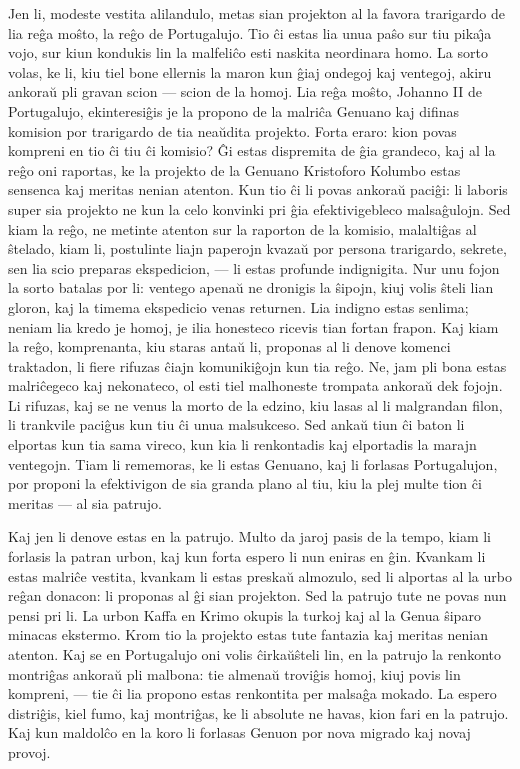    Jen li, modeste vestita alilandulo, metas sian projekton al la
favora trarigardo de lia re\^ga mo\^sto, la re\^go de Portugalujo.
Tio \^ci estas lia unua pa\^so sur tiu pika\^{\j}a vojo, sur kiun
kondukis lin la malfeli\^co esti naskita neordinara homo. La sorto
volas, ke li, kiu tiel bone ellernis la maron kun \^giaj ondegoj kaj
ventegoj, akiru ankora\u u pli gravan scion --- scion de la homoj.
Lia re\^ga mo\^sto, Johanno II de Portugalujo, ekinteresi\^gis je la
propono de la malri\^ca Genuano kaj difinas komision por trarigardo
de tia nea\u udita projekto. Forta eraro: kion povas kompreni en tio
\^ci tiu \^ci komisio? \^Gi estas dispremita de \^gia grandeco, kaj
al la re\^go oni raportas, ke la projekto de la Genuano Kristoforo
Kolumbo estas sensenca kaj meritas nenian atenton. Kun tio \^ci li
povas ankora\u u paci\^gi: li laboris super sia projekto ne kun la
celo konvinki pri \^gia efektivigebleco malsa\^gulojn. Sed kiam la
re\^go, ne metinte atenton sur la raporton de la komisio,
malalti\^gas al \^stelado, kiam li, postulinte liajn paperojn
kvaza\u u por persona trarigardo, sekrete, sen lia scio preparas
ekspedicion, --- li estas profunde indignigita. Nur unu fojon la
sorto batalas por li: ventego apena\u u ne dronigis la \^sipojn,
kiuj volis \^steli lian gloron, kaj la timema ekspedicio venas
returnen. Lia indigno estas senlima; neniam lia kredo je homoj, je
ilia honesteco ricevis tian fortan frapon. Kaj kiam la re\^go,
komprenanta, kiu staras anta\u u li, proponas al li denove komenci
traktadon, li fiere rifuzas \^ciajn komuniki\^gojn kun tia re\^go.
Ne, jam pli bona estas malri\^cegeco kaj nekonateco, ol esti tiel
malhoneste trompata ankora\u u dek fojojn. Li rifuzas, kaj se ne
venus la morto de la edzino, kiu lasas al li malgrandan filon, li
trankvile paci\^gus kun tiu \^ci unua malsukceso. Sed anka\u u tiun
\^ci baton li elportas kun tia sama vireco, kun kia li renkontadis
kaj elportadis la marajn ventegojn. Tiam li rememoras, ke li estas
Genuano, kaj li forlasas Portugalujon, por proponi la efektivigon de
sia granda plano al tiu, kiu la plej multe tion \^ci meritas --- al
sia patrujo.

   Kaj jen li denove estas en la patrujo. Multo da jaroj pasis de la
tempo, kiam li forlasis la patran urbon, kaj kun forta espero li nun
eniras en \^gin. Kvankam li estas malri\^ce vestita, kvankam li
estas preska\u u almozulo, sed li alportas al la urbo re\^gan
donacon: li proponas al \^gi sian projekton. Sed la patrujo tute ne
povas nun pensi pri li. La urbon Kaffa en Krimo okupis la turkoj kaj
al la Genua \^siparo minacas ekstermo. Krom tio la projekto estas
tute fantazia kaj meritas nenian atenton. Kaj se en Portugalujo oni
volis \^cirka\u u\^steli lin, en la patrujo la renkonto montri\^gas
ankora\u u pli malbona: tie almena\u u trovi\^gis homoj, kiuj povis
lin kompreni, --- tie \^ci lia propono estas renkontita per
malsa\^ga mokado. La espero distri\^gis, kiel fumo, kaj montri\^gas,
ke li absolute ne havas, kion fari en la patrujo. Kaj kun maldol\^co
en la koro li forlasas Genuon por nova migrado kaj novaj provoj.

